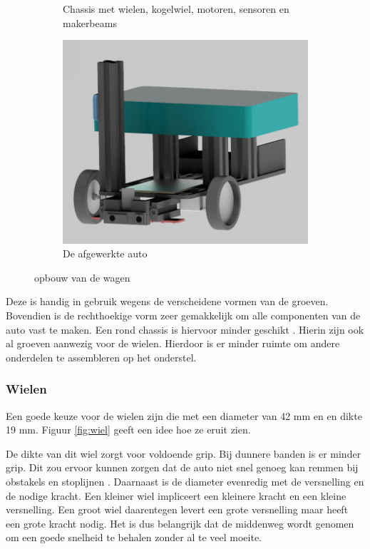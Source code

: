 \documentclass[a4paper,twoside,kulak]{kulakreport} %
\begin{document}
\begin{figure}[ht]
\begin{subfigure}[b]{0.5\linewidth}
		\caption{Chassis met wielen, kogelwiel, motoren, sensoren en makerbeams} 
		\label{opbouw3} 
	\end{subfigure}%
	\begin{subfigure}[b]{0.5\linewidth}
		\centering
		\includegraphics[width=0.75\linewidth]{4Volledig} 
		\caption{De afgewerkte auto} 
		\label{opbouw4} 
	\end{subfigure} 
	\caption{opbouw van de wagen}
	\label{opbouwvanwagen} 
\end{figure}

Deze is handig in gebruik wegens de verscheidene vormen van de groeven. %
Bovendien is de rechthoekige vorm zeer gemakkelijk om alle componenten van de auto vast te maken. Een rond chassis is hiervoor minder geschikt \cite{RobotChassis}. Hierin zijn ook al groeven aanwezig voor de wielen. Hierdoor is er minder ruimte om andere onderdelen te assembleren op het onderstel. %
\label{Chassis}

\subsubsection{Wielen}
Een goede keuze voor de wielen zijn die met een diameter van 42 mm en en dikte 19 mm.
Figuur \ref{fig:wiel} geeft een idee hoe ze eruit zien.

De dikte van dit wiel zorgt voor voldoende grip. Bij dunnere banden is er minder grip. Dit zou ervoor kunnen zorgen dat de auto niet snel genoeg kan remmen bij obstakels en stoplijnen \cite{Banden}.  
Daarnaast is de diameter evenredig met de versnelling en de nodige kracht. Een kleiner wiel impliceert een kleinere kracht en een kleine versnelling. Een groot wiel daarentegen levert een grote versnelling maar heeft een grote kracht nodig. Het is dus belangrijk dat de middenweg wordt genomen om een goede snelheid te behalen zonder al te veel moeite.    
\end{document}
